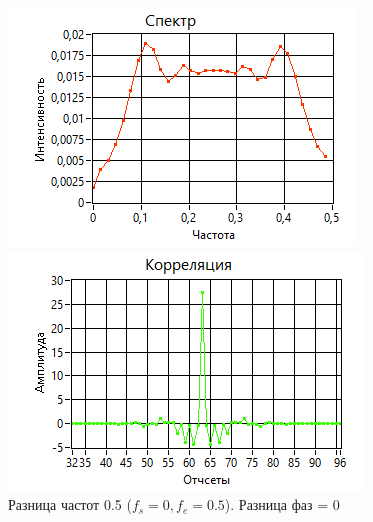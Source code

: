 \begin{figure}[h!]
    \centering
    \begin{minipage}{0.49\linewidth}
        \includegraphics[width =0.9\linewidth]{imgs/spec1.png}
    \end{minipage}
    \begin{minipage}{0.49\linewidth}
        \includegraphics[width =0.9\linewidth]{imgs/corr1.png}
    \end{minipage}
	\caption{Разница частот 0.5 ($f_{s}=0, f_{e}=0.5$). Разница фаз = 0}
	\label{fig:spec1}
\end{figure}

